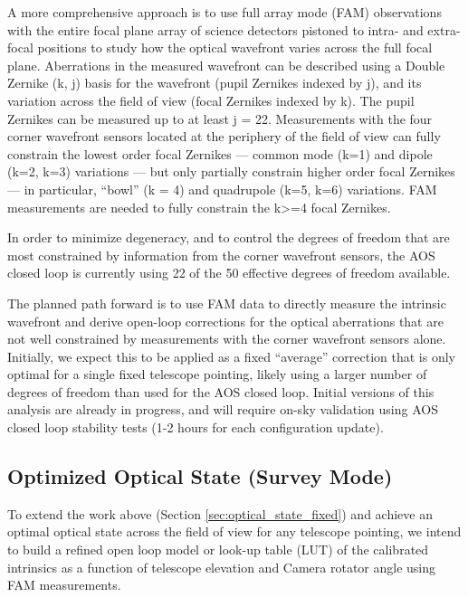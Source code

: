 \documentclass[SO,lsst,authoryear,toc]{lsstdoc}
\begin{document}
A more comprehensive approach is to use full array mode (FAM) observations with the entire focal plane array of science detectors pistoned to intra- and extra-focal positions to study how the optical wavefront varies across the full focal plane. Aberrations in the measured wavefront can be described using a Double Zernike (k, j) basis for the wavefront (pupil Zernikes indexed by j), and its variation across the field of view (focal Zernikes indexed by k). The pupil Zernikes can be measured up to at least j = 22. Measurements with the four corner wavefront sensors located at the periphery of the field of view can fully constrain the lowest order focal Zernikes — common mode (k=1) and dipole (k=2, k=3) variations — but only partially constrain higher order focal Zernikes — in particular, “bowl” (k = 4) and quadrupole (k=5, k=6) variations. FAM measurements are needed to fully constrain the k>=4 focal Zernikes.

In order to minimize degeneracy, and to control the degrees of freedom that are most constrained by information from the corner wavefront sensors, the AOS closed loop is currently using 22 of the 50 effective degrees of freedom available.

The planned path forward is to use FAM data to directly measure the intrinsic wavefront and derive open-loop corrections for the optical aberrations that are not well constrained by measurements with the corner wavefront sensors alone. Initially, we expect this to be applied as a fixed ``average'' correction that is only optimal for a single fixed telescope pointing, likely using a larger number of degrees of freedom than used for the AOS closed loop. Initial versions of this analysis are already in progress, and will require on-sky validation using AOS closed loop stability tests (1-2 hours for each configuration update).

\subsection{Optimized Optical State (Survey Mode)}
\label{sec:optical_state_survey}

To extend the work above (Section \ref{sec:optical_state_fixed}) and achieve an optimal optical state across the field of view for any telescope pointing, we intend to build a refined open loop model or look-up table (LUT) of the calibrated intrinsics as a function of telescope elevation and Camera rotator angle using FAM measurements.
\end{document}
